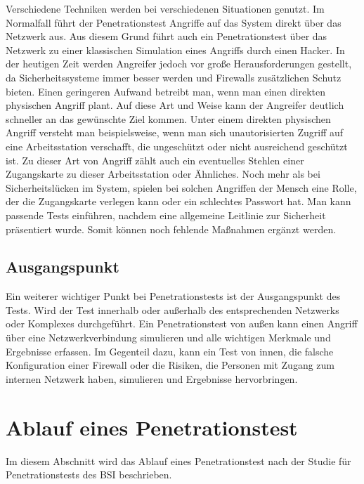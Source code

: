Verschiedene Techniken werden bei verschiedenen Situationen genutzt. Im Normalfall führt der Penetrationstest Angriffe auf das System direkt über das Netzwerk aus. Aus diesem Grund führt auch ein Penetrationstest über das Netzwerk zu einer klassischen Simulation eines Angriffs durch einen Hacker. In der heutigen Zeit werden Angreifer jedoch vor große Herausforderungen gestellt, da Sicherheitssysteme immer besser werden und Firewalls zusätzlichen Schutz bieten. Einen geringeren Aufwand betreibt man, wenn man einen direkten physischen Angriff plant. Auf diese Art und Weise kann der Angreifer deutlich schneller an das gewünschte Ziel kommen. Unter einem direkten physischen Angriff versteht man beispielsweise, wenn man sich unautorisierten Zugriff auf eine Arbeitsstation verschafft, die ungeschützt oder nicht ausreichend geschützt ist. Zu dieser Art von Angriff zählt auch ein eventuelles Stehlen einer Zugangskarte zu dieser Arbeitsstation oder Ähnliches. Noch mehr als bei Sicherheitslücken im System, spielen bei solchen Angriffen der Mensch eine Rolle, der die Zugangskarte verlegen kann oder ein schlechtes Passwort hat.
Man kann passende Tests einführen, nachdem eine allgemeine Leitlinie zur Sicherheit präsentiert wurde. Somit können noch fehlende Maßnahmen ergänzt werden\cite[15--16]{pt03bsi}. 

\subsection{Ausgangspunkt}

Ein weiterer wichtiger Punkt bei Penetrationstests ist der Ausgangspunkt des Tests. Wird der Test innerhalb oder außerhalb des entsprechenden Netzwerks oder Komplexes durchgeführt. Ein Penetrationstest von außen kann einen Angriff über eine Netzwerkverbindung simulieren und alle wichtigen Merkmale und Ergebnisse erfassen. Im Gegenteil dazu, kann ein Test von innen, die falsche Konfiguration einer Firewall oder die Risiken, die Personen mit Zugang zum internen Netzwerk haben, simulieren und Ergebnisse hervorbringen\cite[16--17]{pt03bsi}. 

\section{Ablauf eines Penetrationstest}
\label{ablaufpentest}

Im diesem Abschnitt wird das Ablauf eines Penetrationstest nach der Studie für Penetrationstests des BSI\cite{pt03bsi} beschrieben.

